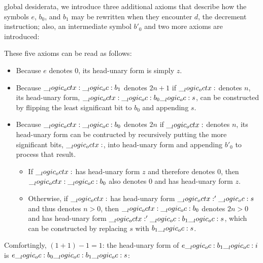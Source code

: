  global desiderata, we introduce three additional axioms that describe how the symbols $e$, $b_0$, and $b_1$ may be rewritten when they encounter $d$, the decrement instruction;
also, an intermediate symbol $b'_0$ and two more axioms are introduced:
These five axioms can be read as follows:
\begin{itemize}
\item
  Because $e$ denotes $0$, its head-unary form is simply $z$.
\item
  Because $\__logic_octx: \__logic_oc: b_1$ denotes $2n+1$ if $\__logic_octx:$ denotes $n$, its head-unary form, $\__logic_octx: \__logic_oc: b_0 \__logic_oc: s$, can be constructed by flipping the least significant bit to $b_0$ and appending $s$.
\item
  Because $\__logic_octx: \__logic_oc: b_0$ denotes $2n$ if $\__logic_octx:$ denotes $n$, its head-unary form can be contructed by recursively putting the more significant bits, $\__logic_octx:$, into head-unary form and appending $b'_0$ to process that result.
  \begin{itemize}
  \item
    If $\__logic_octx:$ has head-unary form $z$ and therefore denotes $0$, then $\__logic_octx: \__logic_oc: b_0$ also denotes $0$ and has head-unary form $z$.
  \item
    Otherwise, if $\__logic_octx:$ has head-unary form $\__logic_octx:' \__logic_oc: s$ and thus denotes $n > 0$, then $\__logic_octx: \__logic_oc: b_0$ denotes $2n > 0$ and has head-unary form $\__logic_octx:' \__logic_oc: b_1 \__logic_oc: s$, which can be constructed by replacing $s$ with $b_1 \__logic_oc: s$.
  \end{itemize}
\end{itemize}
%
Comfortingly, $(1+1)-1 = 1$: the head-unary form of $e \__logic_oc: b_1 \__logic_oc: i$ is $e \__logic_oc: b_0 \__logic_oc: b_1 \__logic_oc: s$:
